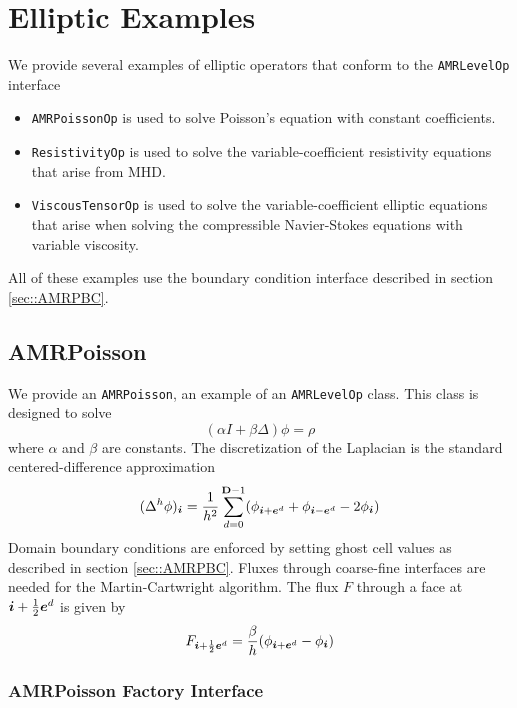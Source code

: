 \section{Elliptic Examples}

We provide several examples of elliptic operators that conform to the
{\tt AMRLevelOp} interface
\begin{itemize}
\item {\tt AMRPoissonOp} is used to solve Poisson's equation with
  constant coefficients.
\item {\tt ResistivityOp} is used to solve the variable-coefficient
  resistivity equations that arise from MHD.
\item {\tt ViscousTensorOp} is used to solve the variable-coefficient
  elliptic equations that arise when solving the compressible Navier-Stokes
  equations with variable viscosity.
\end{itemize}
All of these examples use the boundary condition interface described 
in section \ref{sec::AMRPBC}.   


\subsection{AMRPoisson}

We provide an {\tt AMRPoisson}, an example of an {\tt AMRLevelOp}
class.   This class is designed to solve 
\begin{equation}
(\alpha I + \beta \Delta)\phi = \rho
\label{AMRPoissonEQ}
\end{equation}
where $\alpha$ and $\beta$ are constants.     The discretization of
the Laplacian is the standard centered-difference approximation
$$
(\Delta^h \phi)_{\boldsymbol{i}} = \frac{1}{h^2}\sum\limits^{{\mathbf{D}}-1}_{d=0} 
(\phi_{{\boldsymbol{i}}+{\boldsymbol{e}}^d} + \phi_{{\boldsymbol{i}}-{\boldsymbol{e}}^d} - 2 \phi_{\boldsymbol{i}})
$$
Domain boundary conditions are enforced by setting ghost cell values 
as described in section \ref{sec::AMRPBC}.
Fluxes through coarse-fine interfaces are needed for the
Martin-Cartwright algorithm.  The flux $F$ through a face at ${\boldsymbol{i}} +
\frac{1}{2} {\boldsymbol{e}}^d$ is given by
$$
F_{{\boldsymbol{i}} + \frac{1}{2} {\boldsymbol{e}}^d} = \frac{\beta}{h}(\phi_{{\boldsymbol{i}}+{\boldsymbol{e}}^d} - \phi_{{\boldsymbol{i}}})
$$


\subsubsection{AMRPoisson Factory Interface}


